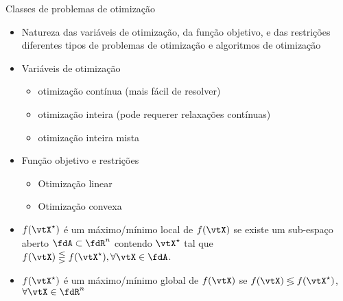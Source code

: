 \begin{frame}{Classes de problemas de otimização}
  \begin{itemize}\addtolength{\itemsep}{0.5\baselineskip}
    \item Natureza das variáveis de otimização, da função objetivo, e das restrições  diferentes tipos de problemas de otimização e algoritmos de otimização

    \item Variáveis de otimização
    \begin{itemize}
      \item {}  otimização contínua (mais fácil de resolver)
      \item {}  otimização inteira (pode requerer relaxações contínuas)
      \item {}  otimização inteira mista
    \end{itemize}

    \item Função objetivo e restrições
    \begin{itemize}
      \item {}  Otimização linear
      \item {}  Otimização convexa
    \end{itemize}

    \item {}  $f( \vtX^{\star} )$ é um máximo/mínimo local de $f(\vtX)$ se existe um sub-espaço aberto $\fdA \subset \fdR^n$ contendo $\vtX^{\star}$ tal que $f(\vtX) \lesseqgtr f(\vtX^{\star}), \forall \vtX \in \fdA$.

		\item {}  $f( \vtX^{\star} )$ é um máximo/mínimo global de $f(\vtX)$ se $f(\vtX) \lessgtr f(\vtX^{\star})$,   $ \forall \vtX \in \fdR^n$
  \end{itemize}
\end{frame}


